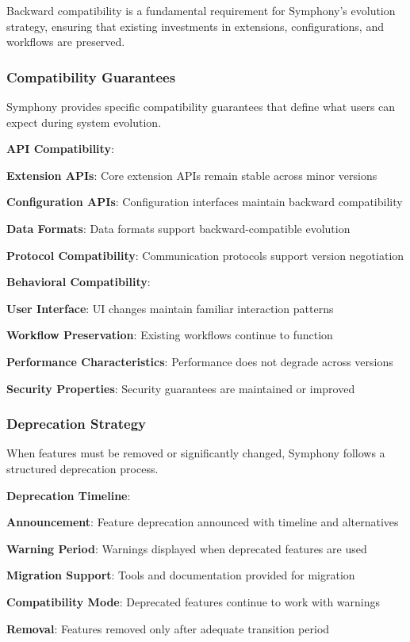 Backward compatibility is a fundamental requirement for Symphony's evolution strategy, ensuring that existing investments in extensions, configurations, and workflows are preserved.

\subsubsection*{Compatibility Guarantees}

Symphony provides specific compatibility guarantees that define what users can expect during system evolution.

\textbf{API Compatibility}:
\begin{compactlist}
    \item \textbf{Extension APIs}: Core extension APIs remain stable across minor versions
    \item \textbf{Configuration APIs}: Configuration interfaces maintain backward compatibility
    \item \textbf{Data Formats}: Data formats support backward-compatible evolution
    \item \textbf{Protocol Compatibility}: Communication protocols support version negotiation
\end{compactlist}

\textbf{Behavioral Compatibility}:
\begin{compactlist}
    \item \textbf{User Interface}: UI changes maintain familiar interaction patterns
    \item \textbf{Workflow Preservation}: Existing workflows continue to function
    \item \textbf{Performance Characteristics}: Performance does not degrade across versions
    \item \textbf{Security Properties}: Security guarantees are maintained or improved
\end{compactlist}

\subsubsection*{Deprecation Strategy}

When features must be removed or significantly changed, Symphony follows a structured deprecation process.

\textbf{Deprecation Timeline}:
\begin{expandedlist}
    \item \textbf{Announcement}: Feature deprecation announced with timeline and alternatives
    \item \textbf{Warning Period}: Warnings displayed when deprecated features are used
    \item \textbf{Migration Support}: Tools and documentation provided for migration
    \item \textbf{Compatibility Mode}: Deprecated features continue to work with warnings
    \item \textbf{Removal}: Features removed only after adequate transition period
\end{expandedlist}


